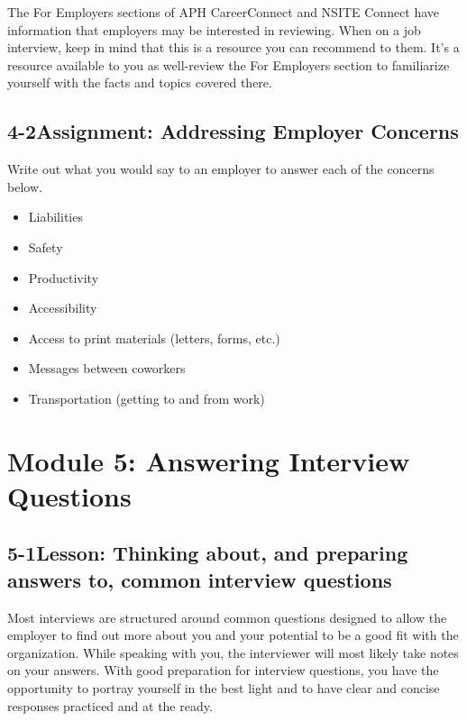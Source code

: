 The For Employers sections of APH CareerConnect and NSITE Connect have information that employers may be interested in reviewing. When on a job interview, keep in mind that this is a resource you can recommend to them. It's a resource available to you as well-review the For Employers section to familiarize yourself with the facts and topics covered there.
\pagebreak \subsection*{4-2\quad Assignment: Addressing Employer Concerns}

Write out what you would say to an employer to answer each of the concerns below.
\begin{itemize}[leftmargin=*]
\item Liabilities
\item Safety
\item Productivity
\item Accessibility
\item Access to print materials (letters, forms, etc.)
\item Messages between coworkers
\item Transportation (getting to and from work)
 \end{itemize}
 
\pagebreak \section*{Module 5:	Answering Interview Questions}
\noindent\makebox[\textwidth]{\rule{\linewidth}{0.4pt}}  \localtableofcontents 
\noindent\makebox[\textwidth]{\rule{\linewidth}{0.4pt}} 


\pagebreak \subsection*{5-1\quad Lesson: Thinking about, and preparing answers to, common interview questions}
Most interviews are structured around common questions designed to allow the employer to find out more about you and your potential to be a good fit with the organization. While speaking with you, the interviewer will most likely take notes on your answers. With good preparation for interview questions, you have the opportunity to portray yourself in the best light and to have clear and concise responses practiced and at the ready.

